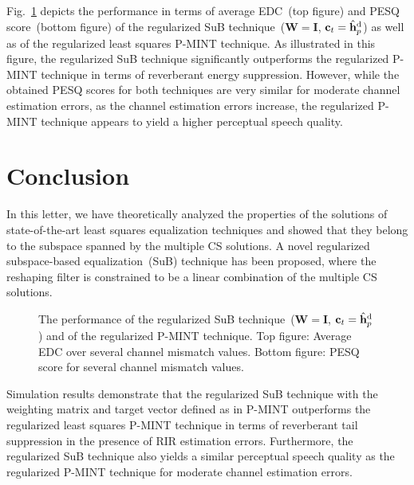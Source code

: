 \documentclass[10pt]{IEEEtran}
\begin{document}
Fig.~\ref{fig: all} depicts the performance in terms of average EDC~(top figure) and PESQ score~(bottom figure) of the regularized SuB technique~($\mathbf{W} = \mathbf{I}$, $\mathbf{c}_t = \hat{\mathbf{h}}_p^{\rm d}$) as well as of the regularized least squares P-MINT technique.
As illustrated in this figure, the regularized SuB technique significantly outperforms the regularized P-MINT technique in terms of reverberant energy suppression.
However, while the obtained PESQ scores for both techniques are very similar for moderate channel estimation errors, as the channel estimation errors increase, the regularized P-MINT technique appears to yield a higher perceptual speech quality.
\section{Conclusion}
In this letter, we have theoretically analyzed the properties of the solutions of state-of-the-art least squares equalization techniques and showed that they belong to the subspace spanned by the multiple CS solutions.
A novel regularized subspace-based equalization~(SuB) technique has been proposed, where the reshaping filter is constrained to be a linear combination of the multiple CS solutions.
\begin{figure}[t!]
  \centering
  
  \caption{The performance of the regularized SuB technique~($\mathbf{W} =\mathbf{I}$, $\mathbf{c}_t = \hat{\mathbf{h}}_p^{\rm d}$) and of the regularized P-MINT technique. Top figure: Average EDC over several channel mismatch values. Bottom figure: PESQ score for several channel mismatch values.}
  \label{fig: all}
\end{figure}
Simulation results demonstrate that the regularized SuB technique with the weighting matrix and target vector defined as in P-MINT outperforms the regularized least squares P-MINT technique in terms of reverberant tail suppression in the presence of RIR estimation errors.
Furthermore, the regularized SuB technique also yields a similar perceptual speech quality as the regularized P-MINT technique for moderate channel estimation errors.


\end{document}
